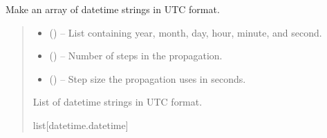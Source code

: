 \documentclass[letterpaper,10pt,english]{sphinxmanual}
\begin{document}

\begin{fulllineitems}
\label{\detokenize{fspsim.utils:fspsim.utils.Conversions.UTC_step}}
\pysigstartsignatures
{}
\pysigstopsignatures
\sphinxAtStartPar
Make an array of datetime strings in UTC format.
\begin{quote}\begin{description}
\begin{itemize}
\item {} 
\sphinxAtStartPar
{} (\sphinxstyleliteralemphasis{\sphinxupquote{{[}}}\sphinxstyleliteralemphasis{\sphinxupquote{{]}}}) – List containing year, month, day, hour, minute, and second.

\item {} 
\sphinxAtStartPar
{} () – Number of steps in the propagation.

\item {} 
\sphinxAtStartPar
{} () – Step size the propagation uses in seconds.

\end{itemize}

\sphinxAtStartPar
List of datetime strings in UTC format.

\sphinxAtStartPar
list{[}datetime.datetime{]}

\end{description}\end{quote}

\end{fulllineitems}

\end{document}
